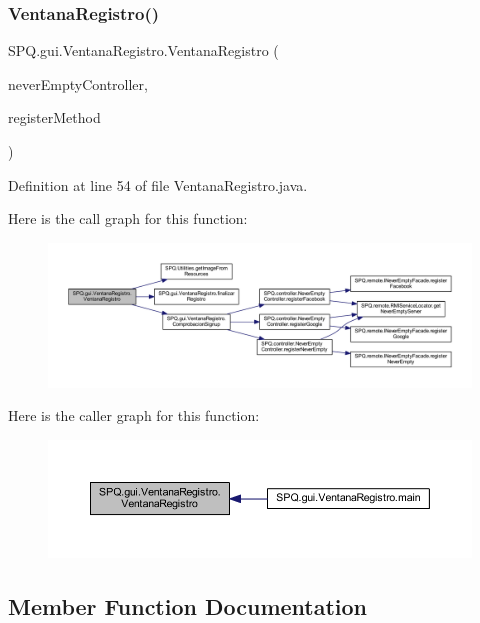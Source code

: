 \subsubsection{\texorpdfstring{Ventana\+Registro()}{VentanaRegistro()}}
{\footnotesize\ttfamily S\+P\+Q.\+gui.\+Ventana\+Registro.\+Ventana\+Registro (\begin{DoxyParamCaption}\item[{\mbox{\hyperlink{class_s_p_q_1_1controller_1_1_never_empty_controller}{Never\+Empty\+Controller}}}]{never\+Empty\+Controller,  }\item[{String}]{register\+Method }\end{DoxyParamCaption})}



Definition at line 54 of file Ventana\+Registro.\+java.

Here is the call graph for this function\+:
\nopagebreak
\begin{figure}[H]
\begin{center}
\leavevmode
\includegraphics[width=350pt]{class_s_p_q_1_1gui_1_1_ventana_registro_a40069db92c94222331b181f23744c14f_cgraph}
\end{center}
\end{figure}
Here is the caller graph for this function\+:
\nopagebreak
\begin{figure}[H]
\begin{center}
\leavevmode
\includegraphics[width=350pt]{class_s_p_q_1_1gui_1_1_ventana_registro_a40069db92c94222331b181f23744c14f_icgraph}
\end{center}
\end{figure}


\subsection{Member Function Documentation}
\mbox{\label{class_s_p_q_1_1gui_1_1_ventana_registro_a409053f213651ce392699ee8c4f07e66}} 
